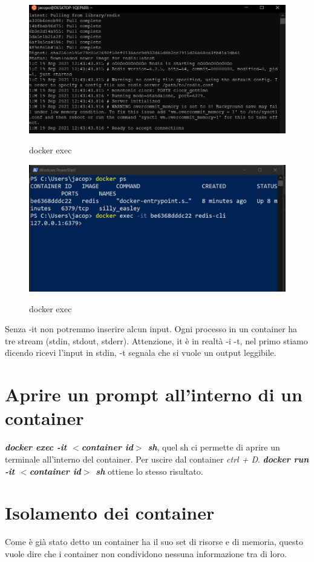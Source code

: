 \documentclass[11pt,a4paper]{book}
\begin{document}
\begin{figure}[h!]
	\begin{center}
		\includegraphics[scale=0.6]{img/007a.jpg}
		\caption{docker exec}
		\label{fig: 007a}
		\includegraphics[scale=0.6]{img/007b.jpg}
		\caption{docker exec}
		\label{fig: 007b}
	\end{center}
\end{figure}

Senza -it non potremmo inserire alcun input. Ogni processo in un container ha tre stream (stdin, stdout, stderr). Attenzione, it è in realtà -i -t, nel primo stiamo dicendo ricevi l'input in stdin, -t segnala che si vuole un output leggibile.

\section{Aprire un prompt all'interno di un container}
\emph{\textbf{docker exec -it $<$container id$>$ sh}}, quel sh ci permette di aprire un terminale all'interno del container. Per uscire dal container \emph{ctrl + D}. \emph{\textbf{docker run -it $<$container id$>$ sh}} ottiene lo stesso risultato.

\section{Isolamento dei container}
Come è già stato detto un container ha il suo set di risorse e di memoria, questo vuole dire che i container non condividono nessuna informazione tra di loro.
\end{document}
